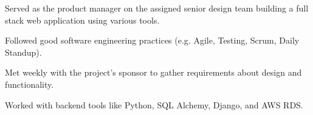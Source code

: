 \documentclass[]{latex/resume}
\begin{document}
\begin{minipage}[t]{0.75\textwidth}
     
    \begin{tightemize}
        \item Served as the product manager on the assigned senior design team building a full stack web application using various tools.
        \item Followed good software engineering practices (e.g. Agile, Testing, Scrum, Daily Standup).
        \item Met weekly with the project's sponsor to gather requirements about design and functionality.
        \item Worked with backend tools like Python, SQL Alchemy, Django, and AWS RDS.
    \end{tightemize}

    \sectionsep




%
%   

\end{minipage} 
\hfill
\end{document}
